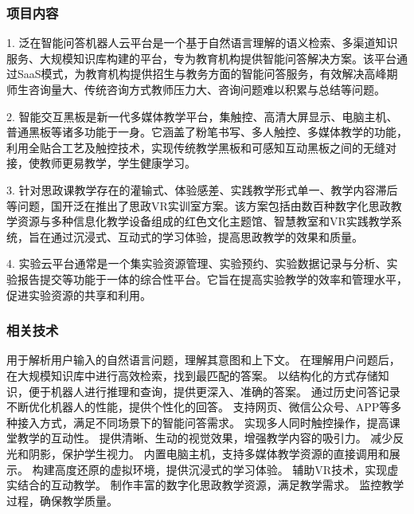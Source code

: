 
\subsubsection{项目内容}


1. 泛在智能问答机器人云平台是一个基于自然语言理解的语义检索、多渠道知识服务、大规模知识库构建的平台，专为教育机构提供智能问答解决方案。该平台通过SaaS模式，为教育机构提供招生与教务方面的智能问答服务，有效解决高峰期师生咨询量大、传统咨询方式教师压力大、咨询问题难以积累与总结等问题。

2. 智能交互黑板是新一代多媒体教学平台，集触控、高清大屏显示、电脑主机、普通黑板等诸多功能于一身。它涵盖了粉笔书写、多人触控、多媒体教学的功能，利用全贴合工艺及触控技术，实现传统教学黑板和可感知互动黑板之间的无缝对接，使教师更易教学，学生健康学习。

3. 针对思政课教学存在的灌输式、体验感差、实践教学形式单一、教学内容滞后等问题，国开泛在推出了思政VR实训室方案。该方案包括由数百种数字化思政教学资源与多种信息化教学设备组成的红色文化主题馆、智慧教室和VR实践教学系统，旨在通过沉浸式、互动式的学习体验，提高思政教学的效果和质量。

4. 实验云平台通常是一个集实验资源管理、实验预约、实验数据记录与分析、实验报告提交等功能于一体的综合性平台。它旨在提高实验教学的效率和管理水平，促进实验资源的共享和利用。

\subsubsection{相关技术}

用于解析用户输入的自然语言问题，理解其意图和上下文。
在理解用户问题后，在大规模知识库中进行高效检索，找到最匹配的答案。
以结构化的方式存储知识，便于机器人进行推理和查询，提供更深入、准确的答案。
通过历史问答记录不断优化机器人的性能，提供个性化的回答。
支持网页、微信公众号、APP等多种接入方式，满足不同场景下的智能问答需求。
实现多人同时触控操作，提高课堂教学的互动性。
提供清晰、生动的视觉效果，增强教学内容的吸引力。
减少反光和阴影，保护学生视力。
内置电脑主机，支持多媒体教学资源的直接调用和展示。
构建高度还原的虚拟环境，提供沉浸式的学习体验。
辅助VR技术，实现虚实结合的互动教学。
制作丰富的数字化思政教学资源，满足教学需求。
监控教学过程，确保教学质量。


